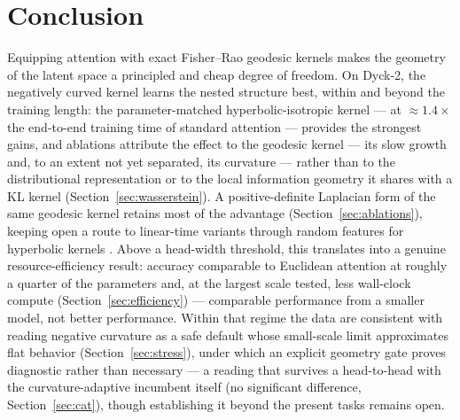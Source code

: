 \documentclass[11pt]{article}
\begin{document}
\section{Conclusion}

Equipping attention with exact Fisher--Rao geodesic kernels makes the geometry of the latent space a principled and cheap degree of freedom. On Dyck-2, the negatively curved kernel learns the nested structure best, within and beyond the training length: the parameter-matched hyperbolic-isotropic kernel --- at $\approx 1.4\times$ the end-to-end training time of standard attention --- provides the strongest gains, and ablations attribute the effect to the geodesic kernel --- its slow growth and, to an extent not yet separated, its curvature --- rather than to the distributional representation or to the local information geometry it shares with a KL kernel (Section~\ref{sec:wasserstein}). A positive-definite Laplacian form of the same geodesic kernel retains most of the advantage (Section~\ref{sec:ablations}), keeping open a route to linear-time variants through random features for hyperbolic kernels \cite{yu2023hyla}. Above a head-width threshold, this translates into a genuine resource-efficiency result: accuracy comparable to Euclidean attention at roughly a quarter of the parameters and, at the largest scale tested, less wall-clock compute (Section~\ref{sec:efficiency}) --- comparable performance from a smaller model, not better performance. Within that regime the data are consistent with reading negative curvature as a safe default whose small-scale limit approximates flat behavior (Section~\ref{sec:stress}), under which an explicit geometry gate proves diagnostic rather than necessary --- a reading that survives a head-to-head with the curvature-adaptive incumbent itself (no significant difference, Section~\ref{sec:cat}), though establishing it beyond the present tasks remains open.
\end{document}
